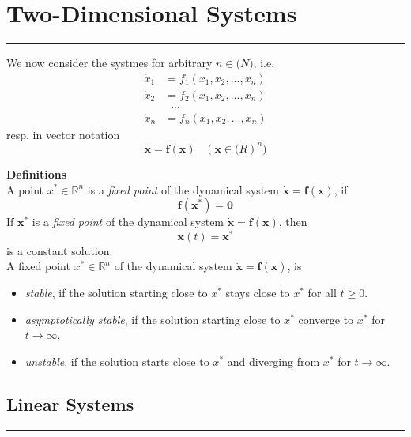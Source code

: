 \section{Two-Dimensional Systems}
\noindent\rule[\linienAbstand]{\linewidth}{\linienDickeDick}
We now consider the systmes for arbitrary $n \in \mathbb(N)$, i.e.
\begin{equation}
  \begin{split}
    \dot{x}_1 &= f_1(x_1, x_2,...,x_n)\\
    \dot{x}_2 &= f_2(x_1, x_2,...,x_n)\\
     &\;\;...\\
    \dot{x}_n &= f_n(x_1, x_2,...,x_n)
  \end{split}
\end{equation}
resp. in vector notation
\begin{equation}
  \dot{\mathbf{x}} = \mathbf{f}(\mathbf{x}) \;\;\; (\mathbf{x}\in\mathbb(R)^n)
\end{equation}


\textbf{Definitions}\\
A point $x^* \in \mathbb{R}^n$ is a \emph{fixed point} of the dynamical system $\dot{\mathbf{x}} =  \mathbf{f}(\mathbf{x})$, if
\begin{equation}
  \mathbf{f}(\mathbf{x^*}) = \mathbf{0}
\end{equation}
If $\mathbf{x^*}$ is a \emph{fixed point} of the dynamical system $\dot{\mathbf{x}} =  \mathbf{f}(\mathbf{x})$, then
\begin{equation}
   \mathbf{x}(t) =  \mathbf{x}^*
\end{equation}
is a constant solution.\\

A fixed point $x^* \in \mathbb{R}^n$ of the dynamical system $\dot{\mathbf{x}} =  \mathbf{f}(\mathbf{x})$, is
\begin{itemize}
  \item \emph{stable}, if the solution starting close to $x^*$ stays close to $x^*$ for all $t \geq 0$.
  \item \emph{asymptotically stable}, if the solution starting close to $x^*$ converge to $x^*$ for $t \rightarrow \infty$.
  \item \emph{unstable}, if the solution starts close to $x^*$ and diverging from $x^*$ for $t \rightarrow \infty$.
\end{itemize}

\subsection{Linear Systems}
\noindent\rule[\linienAbstand]{\linewidth}{\linienDicke}

